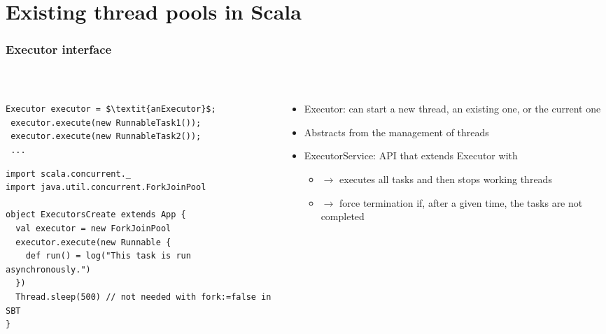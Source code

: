 \documentclass[aspectratio=169]{beamer}
\begin{document}
\section{Existing thread pools in Scala}


\begin{frame}[fragile]\frametitle{Executor interface}
~\\[-8mm]
\begin{columns}
\begin{column}{0.54\textwidth}
\begin{lstlisting}[emph={executor}]
 Executor executor = $\textit{anExecutor}$;
 executor.execute(new RunnableTask1());
 executor.execute(new RunnableTask2());
 ...
\end{lstlisting}
\begin{lstlisting}[emph={executor}]
import scala.concurrent._
import java.util.concurrent.ForkJoinPool

object ExecutorsCreate extends App {
  val executor = new ForkJoinPool
  executor.execute(new Runnable {
    def run() = log("This task is run asynchronously.")
  })
  Thread.sleep(500) // not needed with fork:=false in SBT
}
\end{lstlisting}
\end{column}
\begin{column}{0.49\textwidth}
\begin{itemize}
  \item Executor: can start a new thread, an existing one, or the current one
  \item Abstracts from the management of threads
  \item ExecutorService: API that extends Executor with 
    \begin{itemize}
      \item {} $\to$ executes all tasks and then stops working threads
      \item {} $\to$ force termination if, after a given time, the tasks are not completed
    \end{itemize}
\end{itemize}
\end{column}
\end{columns}
\end{frame}
\end{document}
